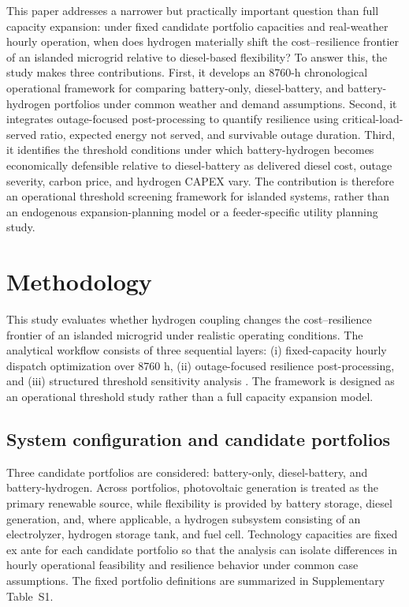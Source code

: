 \documentclass[preprint,12pt]{elsarticle}
\begin{document}
This paper addresses a narrower but practically important question than full capacity expansion: under fixed candidate portfolio capacities and real-weather hourly operation, when does hydrogen materially shift the cost–resilience frontier of an islanded microgrid relative to diesel-based flexibility? To answer this, the study makes three contributions. First, it develops an 8760-h chronological operational framework for comparing battery-only, diesel-battery, and battery-hydrogen portfolios under common weather and demand assumptions. Second, it integrates outage-focused post-processing to quantify resilience using critical-load-served ratio, expected energy not served, and survivable outage duration. Third, it identifies the threshold conditions under which battery-hydrogen becomes economically defensible relative to diesel-battery as delivered diesel cost, outage severity, carbon price, and hydrogen CAPEX vary. The contribution is therefore an operational threshold screening framework for islanded systems, rather than an endogenous expansion-planning model or a feeder-specific utility planning study.
\section{Methodology}

This study evaluates whether hydrogen coupling changes the cost--resilience frontier of an islanded microgrid under realistic operating conditions. The analytical workflow consists of three sequential layers: (i) fixed-capacity hourly dispatch optimization over 8760 h, (ii) outage-focused resilience post-processing, and (iii) structured threshold sensitivity analysis \cite{qi_2025_h2_battery_dispatch,gao_2016_critical_load_restoration,raoufi_2020_power_resilience_metrics,amiri_2024_resilience_framework}. The framework is designed as an operational threshold study rather than a full capacity expansion model.

\subsection{System configuration and candidate portfolios}

Three candidate portfolios are considered: battery-only, diesel-battery, and battery-hydrogen. Across portfolios, photovoltaic generation is treated as the primary renewable source, while flexibility is provided by battery storage, diesel generation, and, where applicable, a hydrogen subsystem consisting of an electrolyzer, hydrogen storage tank, and fuel cell. Technology capacities are fixed ex ante for each candidate portfolio so that the analysis can isolate differences in hourly operational feasibility and resilience behavior under common case assumptions. The fixed portfolio definitions are summarized in Supplementary Table~S1.
\end{document}
